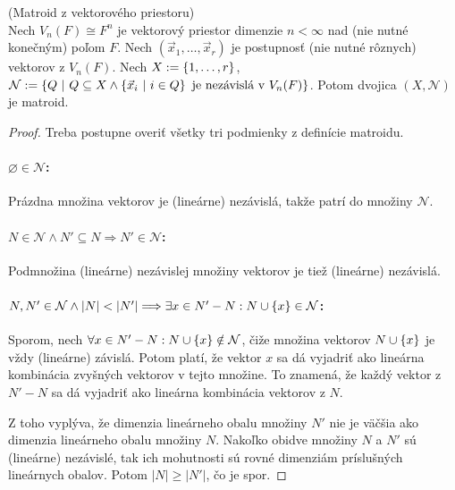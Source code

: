 \begin{theorem}{(Matroid z vektorového priestoru)}\\
Nech $V_n(F) \cong F^n$ je vektorový priestor dimenzie $n < \infty$ nad (nie nutné konečným) poľom $F$.
Nech $(\vec{x}_1, \ldots, \vec{x}_r)$ je postupnosť (nie nutné rôznych) vektorov z $V_n(F)$.
Nech $X := \left\{1, \ldots, r\right\}$, $\mathcal{N} := \left\{Q ~|~ Q \subseteq X \wedge \left\{\vec{x}_i ~|~ i \in Q\right\} \text{ je nezávislá v } V_n(F) \right\}$.
Potom dvojica $(X, \mathcal{N})$ je matroid.
\end{theorem}
\begin{toreview}
\begin{proof}
Treba postupne overiť všetky tri podmienky z definície matroidu.
\paragraph{$\varnothing \in \mathcal{N}$:} Prázdna množina vektorov je (lineárne) nezávislá, takže patrí do množiny $\mathcal{N}$.
\paragraph{$N \in \mathcal{N} \wedge N' \subseteq N \Longrightarrow N' \in \mathcal{N}$:} Podmnožina (lineárne) nezávislej množiny vektorov je tiež (lineárne) nezávislá.
\paragraph{$N, N' \in \mathcal{N} \wedge \left|N\right| < \left|N'\right| \Longrightarrow \exists x \in N' - N: N \cup \left\{x\right\} \in \mathcal{N}$:} 
Sporom, nech $\forall x \in N' - N: N \cup \left\{x\right\} \notin \mathcal{N}$, čiže množina vektorov $N \cup \left\{x\right\}$ je vždy (lineárne) závislá. 
Potom platí, že vektor $x$ sa dá vyjadriť ako lineárna kombinácia zvyšných vektorov v tejto množine.
To znamená, že každý vektor z $N' - N$ sa dá vyjadriť ako lineárna kombinácia vektorov z $N$.

Z toho vyplýva, že dimenzia lineárneho obalu množiny $N'$ nie je väčšia ako dimenzia lineárneho obalu množiny $N$.
Nakoľko obidve množiny $N$ a $N'$ sú (lineárne) nezávislé, tak ich mohutnosti sú rovné dimenziám príslušných lineárnych obalov.
Potom $|N| \geq |N'|$, čo je spor.
\end{proof}
\end{toreview}

